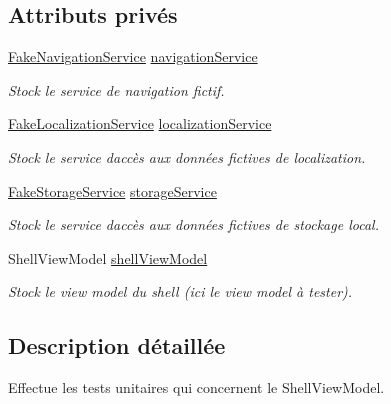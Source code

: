 \subsection*{Attributs privés}
\begin{DoxyCompactItemize}
\item 
\hyperlink{class_boxes_1_1_tests_1_1_mock_1_1_services_1_1_fake_navigation_service}{Fake\+Navigation\+Service} \hyperlink{class_boxes_1_1_tests_1_1_shell_view_model_tests_ad61de5963310e8d3de06995d7186e5b5}{navigation\+Service}
\begin{DoxyCompactList}\small\item\em Stock le service de navigation fictif. \end{DoxyCompactList}\item 
\hyperlink{class_boxes_1_1_tests_1_1_mock_1_1_services_1_1_fake_localization_service}{Fake\+Localization\+Service} \hyperlink{class_boxes_1_1_tests_1_1_shell_view_model_tests_a38e6b16988831f70b14ba1f9890ba708}{localization\+Service}
\begin{DoxyCompactList}\small\item\em Stock le service d\textquotesingle{}accès aux données fictives de localization. \end{DoxyCompactList}\item 
\hyperlink{class_boxes_1_1_tests_1_1_mock_1_1_services_1_1_fake_storage_service}{Fake\+Storage\+Service} \hyperlink{class_boxes_1_1_tests_1_1_shell_view_model_tests_a522dc3fa1aceb357d0e3c133d27f11b5}{storage\+Service}
\begin{DoxyCompactList}\small\item\em Stock le service d\textquotesingle{}accès aux données fictives de stockage local. \end{DoxyCompactList}\item 
Shell\+View\+Model \hyperlink{class_boxes_1_1_tests_1_1_shell_view_model_tests_a1789e91b13033d118335621e54940a16}{shell\+View\+Model}
\begin{DoxyCompactList}\small\item\em Stock le view model du shell (ici le view model à tester). \end{DoxyCompactList}\end{DoxyCompactItemize}


\subsection{Description détaillée}
Effectue les tests unitaires qui concernent le Shell\+View\+Model. 



